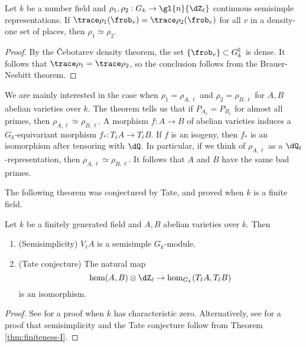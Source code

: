 \begin{theorem}\label{thm:trace-determines-rep}
Let $k$ be a number field and $\rho_1,\rho_2:G_k \to \gl{n}{\dZ_\ell}$ 
continuous semisimple representations. If 
$\trace \rho_1(\frob_v) = \trace \rho_2(\frob_v)$ for all $v$ in a density-one 
set of places, then $\rho_1\simeq \rho_2$. 
\end{theorem}
\begin{proof}
By the \v Cebotarev density theorem, the set $\{\frob_v\}\subset G_k^\natural$ 
is dense. It follows that $\trace \rho_1 = \trace \rho_2$, so the conclusion 
follows from the Brauer-Nesbitt theorem. 
\end{proof}

We are mainly interested in the case when $\rho_1=\rho_{A,\ell}$ and 
$\rho_2=\rho_{B,\ell}$ for $A,B$ abelian varieties over $k$. The theorem tells 
us that if $P_{A_v} = P_{B_v}$ for almost all primes, then 
$\rho_{A,\ell}\simeq \rho_{B,\ell}$. A morphism $f:A\to B$ of abelian varieties 
induces a $G_k$-equivariant morphism $f_\ast:T_\ell A \to T_\ell B$. If $f$ is 
an isogeny, then $f_\ast$ is an isomorphism after tensoring with $\dQ$. In 
particular, if we think of $\rho_{A,\ell}$ as a $\dQ_\ell$-representation, then 
$\rho_{A,\ell}\simeq \rho_{B,\ell}$. It follows that $A$ and $B$ have the same 
bad primes. 

The following theorem was conjectured by Tate, and proved when $k$ is a finite 
field. 

\begin{theorem}[Faltings]
Let $k$ be a finitely generated field and $A,B$ abelian varieties over $k$. 
Then 
\begin{enumerate} %
  \item (Semisimplicity) $V_\ell A$ is a semisimple $G_k$-module. 
  \item (Tate conjecture) The natural map
    \[
      \hom(A,B)\otimes\dZ_\ell \to \hom_{G_k}(T_\ell A,T_\ell B)
    \]
    is an isomorphism. 
\end{enumerate}
\end{theorem}
\begin{proof}
See \cite{fa84} for a proof when $k$ has characteristic zero. Alternatively, 
see \cite[IV.2.5]{mi-av} for a proof that semisimplicity and the Tate 
conjecture follow from Theorem \ref{thm:finiteness-I}. 
\end{proof}


